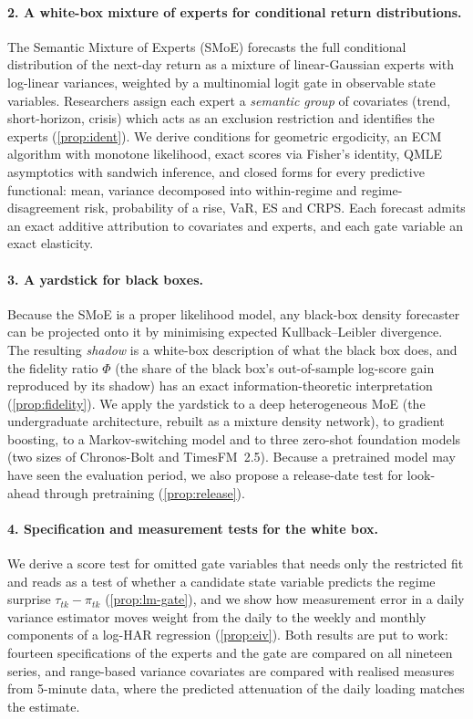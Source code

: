 \paragraph{2. A white-box mixture of experts for conditional return distributions.}
The Semantic Mixture of Experts (SMoE) forecasts the full conditional distribution of the next-day
return as a mixture of linear-Gaussian experts with log-linear variances, weighted by a multinomial
logit gate in observable state variables. Researchers assign each expert a \emph{semantic group} of
covariates (trend, short-horizon, crisis) which acts as an exclusion restriction and identifies the
experts (\cref{prop:ident}). We derive conditions for geometric ergodicity, an ECM algorithm with
monotone likelihood, exact scores via Fisher's identity, QMLE asymptotics with sandwich inference, and
closed forms for every predictive functional: mean, variance decomposed into within-regime and
regime-disagreement risk, probability of a rise, VaR, ES and CRPS. Each forecast admits an exact additive
attribution to covariates and experts, and each gate variable an exact elasticity.

\paragraph{3. A yardstick for black boxes.}
Because the SMoE is a proper likelihood model, any black-box density forecaster can be projected onto it
by minimising expected Kullback--Leibler divergence. The resulting \emph{shadow} is a white-box
description of what the black box does, and the fidelity ratio $\Phi$ (the share of the black box's
out-of-sample log-score gain reproduced by its shadow) has an exact information-theoretic
interpretation (\cref{prop:fidelity}). We apply the yardstick to a deep heterogeneous MoE (the
undergraduate architecture, rebuilt as a mixture density network), to gradient boosting, to a
Markov-switching model and to three zero-shot foundation models (two sizes of Chronos-Bolt and
TimesFM~2.5). Because a pretrained model may have seen the evaluation period, we also propose a
release-date test for look-ahead through pretraining (\cref{prop:release}).

\paragraph{4. Specification and measurement tests for the white box.}
We derive a score test for omitted gate variables that needs only the restricted fit and reads as
a test of whether a candidate state variable predicts the regime surprise $\tau_{tk}-\pi_{tk}$
(\cref{prop:lm-gate}), and we show how measurement error in a daily variance estimator moves weight
from the daily to the weekly and monthly components of a log-HAR regression (\cref{prop:eiv}). Both
results are put to work: fourteen specifications of the experts and the gate are compared on all
nineteen series, and range-based variance covariates are compared with realised measures from
5-minute data, where the predicted attenuation of the daily loading matches the estimate.

